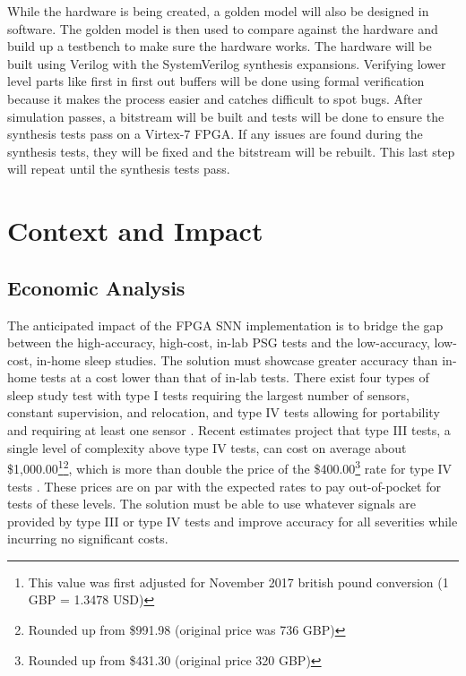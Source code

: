 \documentclass[12pt,titlepage]{article}
\begin{document}
While the hardware is being created, a golden model will also be designed in software. The golden model is then used to compare against the hardware and
build up a testbench to make sure the hardware works. The hardware will be built using Verilog with the SystemVerilog synthesis expansions. Verifying lower
level parts like first in first out buffers will be done using formal verification because it makes the process easier and catches difficult to spot bugs.
After simulation passes, a bitstream will be built and tests will be done to ensure the synthesis tests pass on a Virtex-7 FPGA. If any issues are found
during the synthesis tests, they will be fixed and the bitstream will be rebuilt. This last step will repeat until the synthesis tests pass.

\section{Context and Impact}
\subsection{Economic Analysis}
The anticipated impact of the FPGA SNN implementation is to bridge the gap between the high-accuracy, high-cost, in-lab PSG tests and the
low-accuracy, low-cost, in-home sleep studies. The solution must showcase greater accuracy than in-home tests at a cost lower than that of
in-lab tests. There exist four types of sleep study test with type I tests requiring the largest number of sensors, constant supervision,
and relocation, and type IV tests allowing for portability and requiring at least one sensor \cite{elsevier}. Recent estimates project that
type III tests, a single level of complexity above type IV tests, can cost on average about \$1,000.00\footnote[1]{This value was first
adjusted for November 2017 british pound conversion (1 GBP = 1.3478 USD)}\footnote{Rounded up from \$991.98 (original price was 736 GBP)},
which is more than double the price of the \$400.00\footnotemark[1]\footnote{Rounded up from \$431.30 (original price 320 GBP)} rate for
type IV tests \cite{chai}. These prices are on par with the expected rates to pay out-of-pocket for tests of these
levels. The solution must be able to use whatever signals are provided by type III or type IV tests and improve accuracy for all severities
while incurring no significant costs. 
\end{document}
